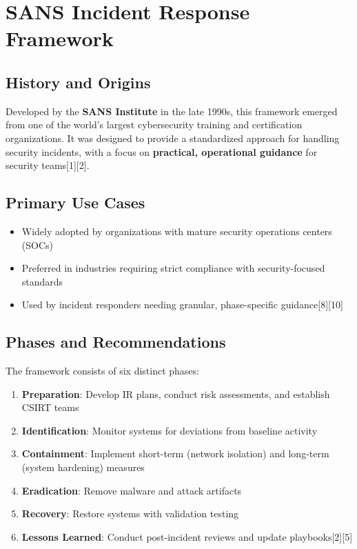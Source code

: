 \documentclass[11pt]{book}
\begin{document}
\tableofcontents
\thispagestyle{empty}
\clearpage

\chapter{SANS Incident Response Framework}

\section{History and Origins}
Developed by the \textbf{SANS Institute} in the late 1990s, this framework emerged from one of the world's largest cybersecurity training and certification organizations. It was designed to provide a standardized approach for handling security incidents, with a focus on \textbf{practical, operational guidance} for security teams[1][2].

\section{Primary Use Cases}
\begin{itemize}
    \item Widely adopted by organizations with mature security operations centers (SOCs)
    \item Preferred in industries requiring strict compliance with security-focused standards
    \item Used by incident responders needing granular, phase-specific guidance[8][10]
\end{itemize}

\section{Phases and Recommendations}
The framework consists of six distinct phases:
\begin{enumerate}
    \item \textbf{Preparation}: Develop IR plans, conduct risk assessments, and establish CSIRT teams
    \item \textbf{Identification}: Monitor systems for deviations from baseline activity
    \item \textbf{Containment}: Implement short-term (network isolation) and long-term (system hardening) measures
    \item \textbf{Eradication}: Remove malware and attack artifacts
    \item \textbf{Recovery}: Restore systems with validation testing
    \item \textbf{Lessons Learned}: Conduct post-incident reviews and update playbooks[2][5]
\end{enumerate}
\end{document}
